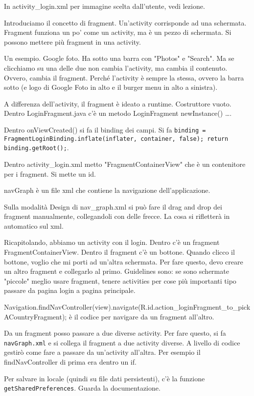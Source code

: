 \par In activity\_login.xml per immagine scelta dall'utente, vedi lezione.

\par Introduciamo il concetto di fragment. Un'activity corrisponde ad una schermata. Fragment funziona un po' come un activity, ma è un pezzo di schermata. Si possono mettere più fragment in una activity. 
\par Un esempio. Google foto. Ha sotto una barra con "Photos" e "Search". Ma se clicchiamo su una delle due non cambia l'activity, ma cambia il contenuto. Ovvero, cambia il fragment. Perché l'activity è sempre la stessa, ovvero la barra sotto (e logo di Google Foto in alto e il burger menu in alto a sinistra).
\par A differenza dell'activity, il fragment è ideato a runtime. Costruttore vuoto. Dentro LoginFragment.java c'è un metodo LoginFragment newInstance() {\dots}.
\par Dentro onViewCreated() si fa il binding dei campi. Si fa \texttt{binding = FragmentLoginBinding.inflate(inflater, container, false); return binding.getRoot();}.
\par Dentro activity\_login.xml metto "FragmentContainerView" che è un contenitore per i fragment. Si mette un id. 
\par navGraph è un file xml che contiene la navigazione dell'applicazione. 
\par Sulla modalità Design di nav\_graph.xml si può fare il drag and drop dei fragment manualmente, collegandoli con delle frecce. La cosa si rifletterà in automatico sul xml.
\par Ricapitolando, abbiamo un activity con il login. Dentro c'è un fragment FragmentContainerView. Dentro il fragment c'è un bottone. Quando clicco il bottone, voglio che mi porti ad un'altra schermata. Per fare questo, devo creare un altro fragment e collegarlo al primo. Guidelines sono: se sono schermate "piccole" meglio usare fragment, tenere activities per cose più importanti tipo passare da pagina login a pagina principale.
\par Navigation.findNavController(view).navigate(R.id.action\_loginFragment\_to\_pickACountryFragment); è il codice per navigare da un fragment all'altro.
\par Da un fragment posso passare a due diverse activity. Per fare questo, si fa \texttt{navGraph.xml} e si collega il fragment a due activity diverse. A livello di codice gestirò come fare a passare da un'activity all'altra. Per esempio il findNavController di prima era dentro un if.

\par Per salvare in locale (quindi su file dati persistenti), c'è la funzione \texttt{getSharedPreferences}. Guarda la documentazione.